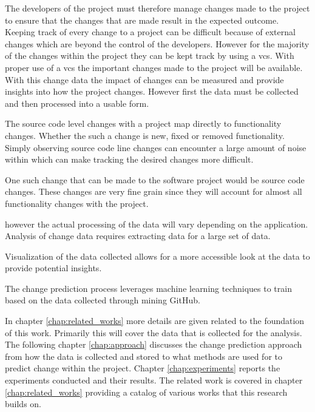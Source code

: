 The developers of the project must therefore manage changes made to the project to ensure that the changes that are made result in the expected outcome. Keeping track of every change to a project can be difficult because of external changes which are beyond the control of the developers. However for the majority of the changes within the project they can be kept track by using a \gls{vcs}. With proper use of a \gls{vcs} the important changes made to the project will be available. With this change data the impact of changes can be measured and provide insights into how the project changes. However first the data must be collected and then processed into a usable form.

The source code level changes with a project map directly to functionality changes. Whether the such a change is new, fixed or removed functionality. Simply observing source code line changes can encounter a large amount of noise within which can make tracking the desired changes more difficult.

One such change that can be made to the software project would be source code changes. These changes are very fine grain since they will account for almost all functionality changes with the project. 

however the actual processing of the data will vary depending on the application. Analysis of change data requires extracting data for a large set of data.

Visualization of the data collected allows for a more accessible look at the data to provide potential insights.

The change prediction process leverages machine learning techniques to train based on the data collected through mining GitHub.

In chapter \ref{chap:related_works} more details are given related to the foundation of this work. Primarily this will cover the data that is collected for the analysis. The following chapter \ref{chap:approach} discusses the change prediction approach from how the data is collected and stored to what methods are used for to predict change within the project. Chapter \ref{chap:experiments} reports the experiments conducted and their results. The related work is covered in chapter \ref{chap:related_works} providing a catalog of various works that this research builds on.